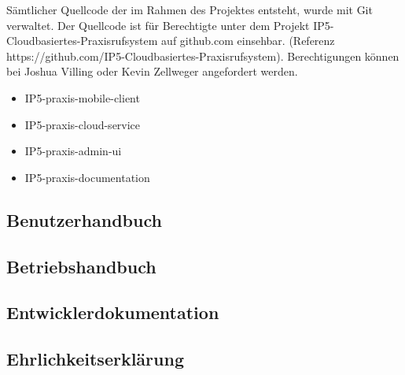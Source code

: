     Sämtlicher Quellcode der im Rahmen des Projektes entsteht, wurde mit Git verwaltet. Der Quellcode ist für Berechtigte unter dem Projekt IP5-Cloudbasiertes-Praxisrufsystem auf github.com einsehbar.
    (Referenz https://github.com/IP5-Cloudbasiertes-Praxisrufsystem). Berechtigungen können bei Joshua Villing oder Kevin Zellweger angefordert werden.

    \begin{itemize}
        \item IP5-praxis-mobile-client
        \item IP5-praxis-cloud-service
        \item IP5-praxis-admin-ui
        \item IP5-praxis-documentation
    \end{itemize}

    \subsection{Benutzerhandbuch}
    \subsection{Betriebshandbuch}
    \subsection{Entwicklerdokumentation}
    \subsection{Ehrlichkeitserklärung}
